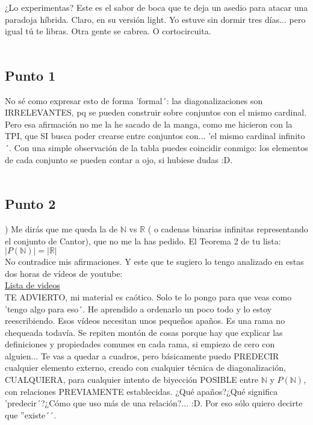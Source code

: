 	\noindent
	¿Lo experimentas? Este es el sabor de boca que te deja un asedio para atacar una paradoja híbrida. Claro, en su versión light. Yo estuve sin dormir tres días... pero igual tú te libras. Otra gente se cabrea. O cortocircuita.\\\\
	
	\subsection{Punto 1}
	
	\noindent
	No sé como expresar esto de forma 'formal´: las diagonalizaciones son IRRELEVANTES, pq se pueden construir sobre conjuntos con el mismo cardinal. Pero esa afirmación no me la he sacado de la manga, como me hicieron con la TPI, que SI busca poder crearse entre conjuntos con... 'el mismo cardinal infinito´. Con una simple observación de la tabla puedes coincidir conmigo: los elementos de cada conjunto se pueden contar a ojo, si hubiese dudas :D.\\\\
	
	\subsection{Punto 2}
	
	) Me dirás que me queda la de $\mathbb{N}$ vs $\mathbb{R}$ ( o cadenas binarias infinitas representando el conjunto de Cantor), que no me la has pedido. El Teorema 2 de tu lista:\\
	$|P(\mathbb{N})| = |\mathbb{R}|$\\
	No contradice mis afirmaciones. Y este que te sugiero lo tengo analizado en estas dos horas de vídeos de youtube:\\
	\href{https://www.youtube.com/watch?v=reRUUKGFXf0&list=PLcEv5UNDUdw68yFXf2kYGDZVyIGpCfGdy}{Lista de videos}\\
	TE ADVIERTO, mi material es caótico. Solo te lo pongo para que veas como 'tengo algo para eso´. He aprendido a ordenarlo un poco todo y lo estoy reescribiendo. Esos vídeos necesitan unos pequeños apaños. Es una rama no chequeada todavía. Se repiten montón de cosas porque hay que explicar las definiciones y propiedades comunes en cada rama, si empiezo de cero con alguien... Te vas a quedar a cuadros, pero básicamente puedo PREDECIR cualquier elemento externo, creado con cualquier técnica de diagonalización, CUALQUIERA, para cualquier intento de biyección POSIBLE entre $\mathbb{N}$ y $P(\mathbb{N})$, con relaciones PREVIAMENTE establecidas. ¿Qué apaños?¿Qué significa 'predecir´?¿Cómo que uso más de una relación?... :D. Por eso sólo quiero decirte que ''existe´´.
	
